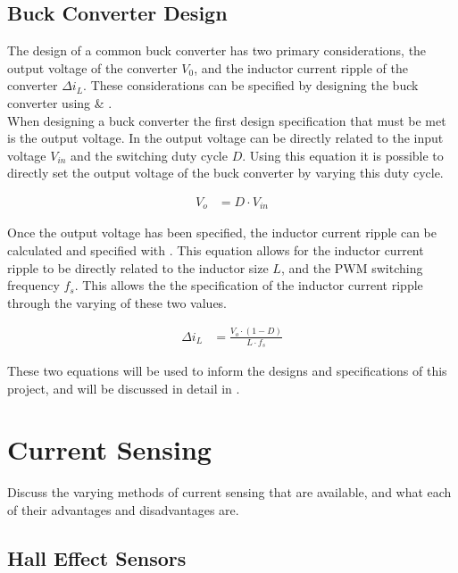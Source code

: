 \subsection{Buck Converter Design}\label{S:buck_design_back}

The design of a common buck converter has two primary considerations, the output voltage of the converter $V_0$, and the inductor current ripple of the converter $\Delta i_L$. These considerations can be specified by designing the buck converter using  \&  \cite{Mohan2012_Design,Hauke2015}.\\ 

When designing a buck converter the first design specification that must be met is the output voltage. In  the output voltage can be directly related to the input voltage $V_{in}$ and the switching duty cycle $D$. Using this equation it is possible to directly set the output voltage of the buck converter by varying this duty cycle.

\begin{align}\label{E:V_out}
	V_o &= D \cdot V_{in}
\end{align}

Once the output voltage has been specified, the inductor current ripple can be calculated and specified with . This equation allows for the inductor current ripple to be directly related to the inductor size $L$, and the PWM switching frequency $f_s$. This allows the the specification of the inductor current ripple through the varying of these two values.

\begin{align}\label{E:delta_i}
   \Delta i_L &= \frac{ V_{o} \cdot \left( 1 - D \right) } {L \cdot f_s}
\end{align}

These two equations will be used to inform the designs and specifications of this project, and will be discussed in detail in .




\section{Current Sensing}\label{S:current_sense_back}

Discuss the varying methods of current sensing that are available, and what each of their advantages and disadvantages are.

\subsection{Hall Effect Sensors}\label{S:hall_effect_back}


